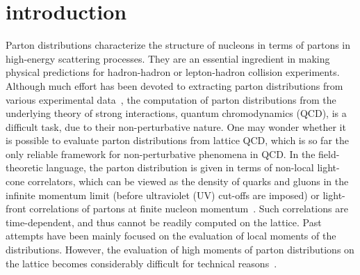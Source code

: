 \section{introduction}
Parton distributions characterize the structure of nucleons in terms of partons in high-energy scattering processes. They are an essential ingredient in making physical predictions for hadron-hadron or lepton-hadron collision experiments. Although much effort has been devoted to extracting parton distributions from various experimental data~\cite{Alekhin:2012ig,Gao:2013xoa,Radescu:2010zz,CooperSarkar:2011aa,Martin:2009iq,Ball:2012cx}, the computation of parton distributions from the underlying theory of strong interactions, quantum chromodynamics (QCD), is a difficult task, due to their non-perturbative nature. One may wonder whether it is possible to evaluate parton distributions from lattice QCD, which is so far the only reliable framework for non-perturbative phenomena in QCD. In the field-theoretic language, the parton distribution is given in terms of non-local light-cone correlators, which can be viewed as the density of quarks and gluons in the infinite momentum limit (before ultraviolet (UV) cut-offs are imposed) or light-front
correlations of partons at finite nucleon momentum~\cite{Collins:2011zzd}. Such correlations are time-dependent, and thus cannot be readily computed on the lattice. Past attempts have been mainly focused on the evaluation of local moments of the distributions. However, the evaluation of high moments of parton distributions on the lattice becomes considerably difficult for technical reasons~\cite{negele}.

